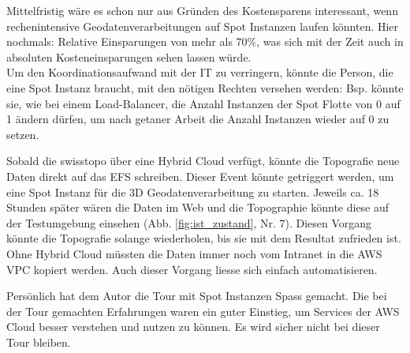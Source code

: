 Mittelfristig wäre es schon nur aus Gründen des Kostensparens interessant, wenn rechenintensive Geodatenverarbeitungen auf Spot Instanzen laufen könnten. Hier nochmals: Relative Einsparungen von mehr als 70\%, was sich mit der Zeit auch in absoluten Kosteneinsparungen sehen lassen würde.\\ Um den Koordinationsaufwand mit der IT zu verringern, könnte die Person, die eine Spot Instanz braucht, mit den nötigen Rechten versehen werden: Bsp. könnte sie, wie bei einem Load-Balancer, die Anzahl Instanzen der Spot Flotte von 0 auf 1 ändern dürfen, um nach getaner Arbeit die Anzahl Instanzen wieder auf 0 zu setzen.

Sobald die swisstopo über eine Hybrid Cloud verfügt, könnte die Topografie neue Daten direkt auf das EFS schreiben. Dieser Event könnte getriggert werden, um eine Spot Instanz für die 3D Geodatenverarbeitung zu starten. Jeweils ca. 18 Stunden später wären die Daten im Web und die Topographie könnte diese auf der Testumgebung einsehen (Abb. \ref{fig:ist_zustand}, Nr. 7). Diesen Vorgang könnte die Topografie solange wiederholen, bis sie mit dem Resultat zufrieden ist.\\Ohne Hybrid Cloud müssten die Daten immer noch vom Intranet in die AWS VPC kopiert werden. Auch dieser Vorgang liesse sich einfach automatisieren.

Persönlich hat dem Autor die Tour mit Spot Instanzen Spass gemacht. Die bei der Tour gemachten Erfahrungen waren ein guter Einstieg, um Services der AWS Cloud besser verstehen und nutzen zu können. Es wird sicher nicht bei dieser Tour bleiben.

